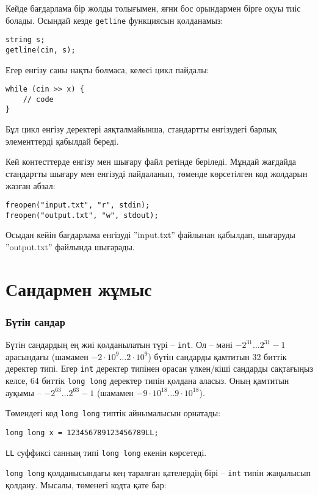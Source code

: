 Кейде бағдарлама бір жолды толығымен, яғни бос орындармен бірге оқуы тиіс болады.
Осындай кезде \texttt{getline} функциясын қолданамыз:

\begin{lstlisting}
string s;
getline(cin, s);
\end{lstlisting}

Егер енгізу саны нақты болмаса, келесі цикл пайдалы:
\begin{lstlisting}
while (cin >> x) {
    // code
}
\end{lstlisting}
Бұл цикл енгізу деректері аяқталмайынша, стандартты енгізудегі барлық элементтерді қабылдай береді.

Кей контесттерде енгізу мен шығару файл ретінде беріледі.
Мұндай жағдайда стандартты шығару мен енгізуді пайдаланып,
төменде көрсетілген код жолдарын жазған абзал:
\begin{lstlisting}
freopen("input.txt", "r", stdin);
freopen("output.txt", "w", stdout);
\end{lstlisting}
Осыдан кейін бағдарлама енгізуді
''input.txt'' файлынан қабылдап,
шығаруды ''output.txt'' файлында шығарады.

\section{Сандармен жұмыс}


\subsubsection{Бүтін сандар}

Бүтін сандардың ең жиі қолданылатын түрі --
\texttt{int}. Ол -- мәні $-2^{31} \ldots 2^{31}-1$
арасындағы (шамамен $-2 \cdot 10^9 \ldots 2 \cdot 10^9$) 
бүтін сандарды қамтитын 32 биттік деректер типі.
Егер \texttt{int} деректер типінен орасан үлкен/кіші сандарды
сақтағыңыз келсе, 64 биттік \texttt{long long} деректер
типін қолдана аласыз. Оның қамтитын ауқымы 
-- $-2^{63} \ldots 2^{63}-1$
(шамамен $-9 \cdot 10^{18} \ldots 9 \cdot 10^{18}$).

Төмендегі код \texttt{long long} типтік 
айнымалысын орнатады:
\begin{lstlisting}
long long x = 123456789123456789LL;
\end{lstlisting}
\texttt{LL} суффиксі санның типі 
\texttt{long long} екенін көрсетеді.

\texttt{long long} қолданысындағы кең 
таралған қателердің бірі --
\texttt{int} типін жаңылысып қолдану. 
Мысалы, төменегі кодта қате бар:

